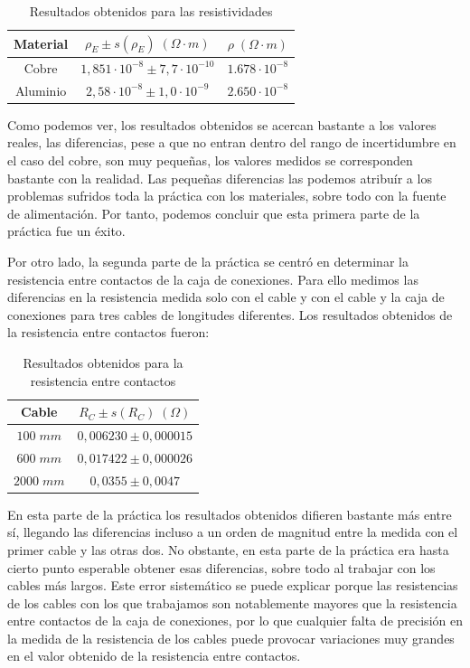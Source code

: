 \documentclass[a4paper,12pt,titlepage]{report}
\begin{document}
\begin{table}[h!]
    \centering
    \begin{tabular}{|c|c|c|}
        \hline
        Material & $\rho_E \pm s(\rho_E) \; (\Omega \cdot m)$ & $\rho \; (\Omega \cdot m)$  \\ \hline
        Cobre  & $1,851 \cdot 10^{-8} \pm 7,7 \cdot 10^{-10}$ & $1.678 \cdot 10^{-8}$ \\ \hline
        Aluminio &$2,58 \cdot 10^{-8} \pm 1,0 \cdot 10^{-9}$ & $2.650\cdot 10^{-8}$\\ \hline
    \end{tabular}
    \caption{Resultados obtenidos para las resistividades}
\end{table}

Como podemos ver, los resultados obtenidos se acercan bastante a los valores reales, las diferencias, pese a que no entran dentro del rango de incertidumbre en el caso del cobre, son muy pequeñas, los valores medidos se corresponden bastante con la realidad. Las pequeñas diferencias las podemos atribuír a los problemas sufridos toda la práctica con los materiales, sobre todo con la fuente de alimentación. Por tanto, podemos concluir que esta primera parte de la práctica fue un éxito.

\par Por otro lado, la segunda parte de la práctica se centró en determinar la resistencia entre contactos de la caja de conexiones. Para ello medimos las diferencias en la resistencia medida solo con el cable y con el cable y la caja de conexiones para tres cables de longitudes diferentes. Los resultados obtenidos de la resistencia entre contactos fueron:

\begin{table}[h!]
    \centering
    \begin{tabular}{|c|c|}
        \hline
        Cable & $R_{C} \pm s(R_C) \; (\Omega)$ \\ \hline
        $100 \; mm$ & $0,006230 \pm 0,000015$\\ \hline
        $600 \; mm$ & $0,017422 \pm 0,000026$\\ \hline
        $2000 \; mm$ & $0,0355 \pm 0,0047$\\ \hline
    \end{tabular}
    \caption{Resultados obtenidos para la resistencia entre contactos}
\end{table}

En esta parte de la práctica los resultados obtenidos difieren bastante más entre sí, llegando las diferencias incluso a un orden de magnitud entre la medida con el primer cable y las otras dos. No obstante, en esta parte de la práctica era hasta cierto punto esperable obtener esas diferencias, sobre todo al trabajar con los cables más largos. Este error sistemático se puede explicar porque las resistencias de los cables con los que trabajamos son notablemente mayores que la resistencia entre contactos de la caja de conexiones, por lo que cualquier falta de precisión en la medida de la resistencia de los cables puede provocar variaciones muy grandes en el valor obtenido de la resistencia entre contactos.
\end{document}
